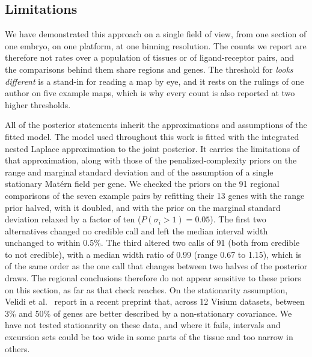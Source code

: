 \documentclass[10pt,letterpaper]{article}
\begin{document}
\subsection*{Limitations}

We have demonstrated this approach on a single field of view, from one section of one embryo, on one platform, at one binning resolution. The counts we report are therefore not rates over a population of tissues or of ligand-receptor pairs, and the comparisons behind them share regions and genes. The threshold for \textit{looks different} is a stand-in for reading a map by eye, and it rests on the rulings of one author on five example maps, which is why every count is also reported at two higher thresholds.

All of the posterior statements inherit the approximations and assumptions of the fitted model. The model used throughout this work is fitted with the integrated nested Laplace approximation to the joint posterior. It carries the limitations of that approximation, along with those of the penalized-complexity priors on the range and marginal standard deviation and of the assumption of a single stationary Mat\'ern field per gene. We checked the priors on the 91 regional comparisons of the seven example pairs by refitting their 13 genes with the range prior halved, with it doubled, and with the prior on the marginal standard deviation relaxed by a factor of ten ($P(\sigma_i > 1) = 0.05$). The first two alternatives changed no credible call and left the median interval width unchanged to within 0.5\%. The third altered two calls of 91 (both from credible to not credible), with a median width ratio of 0.99 (range 0.67 to 1.15), which is of the same order as the one call that changes between two halves of the posterior draws. The regional conclusions therefore do not appear sensitive to these priors on this section, as far as that check reaches. On the stationarity assumption, Velidi et al.\ \cite{velidi2026nonstationarity} report in a recent preprint that, across 12 Visium datasets, between 3\% and 50\% of genes are better described by a non-stationary covariance. We have not tested stationarity on these data, and where it fails, intervals and excursion sets could be too wide in some parts of the tissue and too narrow in others.
\end{document}
